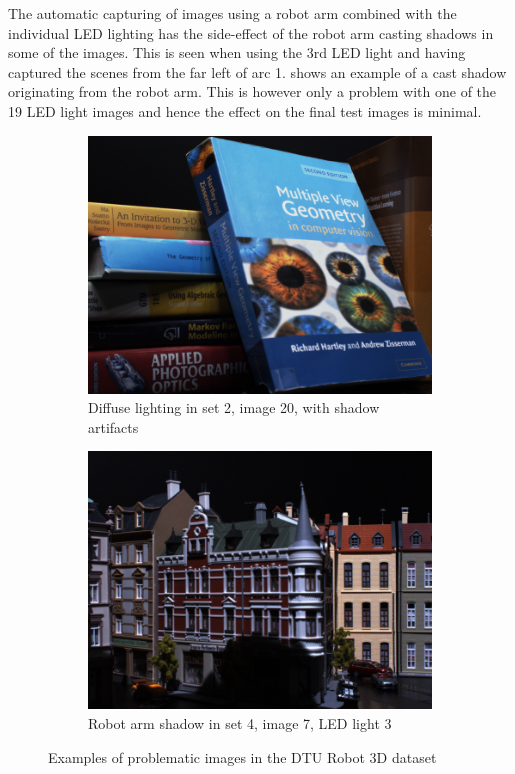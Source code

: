 \documentclass[thesis.tex]{subfiles}
\begin{document}
The automatic capturing of images using a robot arm combined with the individual LED lighting has the side-effect of the robot arm casting shadows in some of the images. This is seen when using the 3rd LED light and having captured the scenes from the far left of arc 1.  shows an example of a cast shadow originating from the robot arm. This is however only a problem with one of the 19 LED light images and hence the effect on the final test images is minimal.
%
\begin{figure}
	\centering
	\begin{subfigure}{0.49\textwidth}
		\includegraphics[width=\textwidth]{img/diffuse_light_problem.png}
		\caption{Diffuse lighting in set 2, image 20, with shadow artifacts}
		\label{fig:dtu_problems_diffuse}
	\end{subfigure}
	\begin{subfigure}{0.49\textwidth}
		\includegraphics[width=\textwidth]{img/robot_arm_shadow.png}
		\caption{Robot arm shadow in set 4, image 7, LED light 3}
		\label{fig:dtu_problems_robot}
	\end{subfigure}
	\caption{Examples of problematic images in the DTU Robot 3D dataset}
	\label{fig:dtu_problems}
\end{figure}
\end{document}
